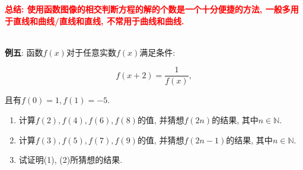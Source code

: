 \documentclass[8pt]{article}
\begin{document}
				\textbf{\textcolor{red}{总结: 使用函数图像的相交判断方程的解的个数是一个十分便捷的方法, 一般多用于直线和曲线/直线和直线, 不常用于曲线和曲线.}}

			~\\

			\textbf{例五}: 函数$f(x)$对于任意实数$f(x)$满足条件:

				$$f(x+2)=\frac{1}{f(x)},$$

				且有$f(0)=1, f(1)=-5.$

				\begin{enumerate}[label=(\arabic*)]
					\item 计算$f(2), f(4), f(6), f(8)$的值, 并猜想$f(2n)$的结果, 其中$n \in \mathbb{N}.$
					\item 计算$f(3), f(5), f(7), f(9)$的值, 并猜想$f(2n-1)$的结果, 其中$n \in \mathbb{N}.$
					\item 试证明(1), (2)所猜想的结果.
				\end{enumerate}
				~\\
\end{document}
